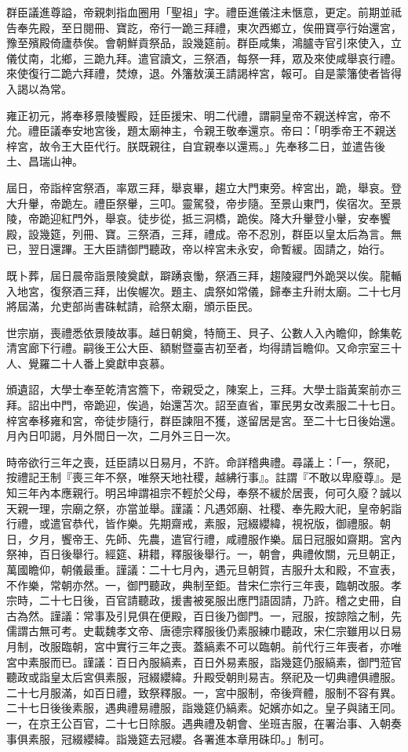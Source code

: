 \begin{pinyinscope}
群臣議進尊謚，帝親刺指血圈用「聖祖」字。禮臣進儀注未愜意，更定。前期並祗告奉先殿，至日閱冊、寶訖，帝行一跪三拜禮，東次西鄉立，俟冊寶亭行始還宮，豫至殯殿倚廬恭俟。會朝鮮貢祭品，設幾筵前。群臣咸集，鴻臚寺官引來使入，立儀仗南，北鄉，三跪九拜。遣官讀文，三祭酒，每祭一拜，眾及來使咸舉哀行禮。來使復行二跪六拜禮，焚燎，退。外籓敖漢王請謁梓宮，報可。自是蒙籓使者皆得入謁以為常。

雍正初元，將奉移景陵饗殿，廷臣援宋、明二代禮，謂嗣皇帝不親送梓宮，帝不允。禮臣議奉安地宮後，題太廟神主，令親王敬奉還京。帝曰：「明季帝王不親送梓宮，故令王大臣代行。朕既親往，自宜親奉以還焉。」先奉移二日，並遣告後土、昌瑞山神。

屆日，帝詣梓宮祭酒，率眾三拜，舉哀畢，趨立大門東旁。梓宮出，跪，舉哀。登大升轝，帝跪左。禮臣祭轝，三叩。靈駕發，帝步隨。至景山東門，俟宿次。至景陵，帝跪迎紅門外，舉哀。徒步從，抵三洞橋，跪俟。降大升轝登小轝，安奉饗殿，設幾筵，列冊、寶。三祭酒，三拜，禮成。帝不忍別，群臣以皇太后為言。無已，翌日還蹕。王大臣請御門聽政，帝以梓宮未永安，命暫緩。固請之，始行。

既卜葬，屆日晨帝詣景陵奠獻，躃踴哀慟，祭酒三拜，趨陵寢門外跪哭以俟。龍輴入地宮，復祭酒三拜，出俟幄次。題主、虞祭如常儀，歸奉主升祔太廟。二十七月將屆滿，允吏部尚書硃軾請，祫祭太廟，頒示臣民。

世宗崩，喪禮悉依景陵故事。越日朝奠，特簡王、貝子、公數人入內瞻仰，餘集乾清宮廊下行禮。嗣後王公大臣、額駙暨臺吉初至者，均得請旨瞻仰。又命宗室三十人、覺羅二十人番上奠獻申哀慕。

頒遺詔，大學士奉至乾清宮簷下，帝親受之，陳案上，三拜。大學士詣黃案前亦三拜。詔出中門，帝跪迎，俟過，始還苫次。詔至直省，軍民男女改素服二十七日。梓宮奉移雍和宮，帝徒步隨行，群臣諫阻不獲，遂留居是宮。至二十七日後始還。月內日叩謁，月外間日一次，二月外三日一次。

時帝欲行三年之喪，廷臣請以日易月，不許。命詳稽典禮。尋議上：「一，祭祀，按禮記王制『喪三年不祭，唯祭天地社稷，越紼行事』。註謂『不敢以卑廢尊』。是知三年內本應親行。明呂坤謂祖宗不輕於父母，奉祭不緩於居喪，何可久廢？誠以天親一理，宗廟之祭，亦當並舉。謹議：凡遇郊廟、社稷、奉先殿大祀，皇帝躬詣行禮，或遣官恭代，皆作樂。先期齋戒，素服，冠綴纓緯，視祝版，御禮服。朝日，夕月，饗帝王、先師、先農，遣官行禮，咸禮服作樂。屆日冠服如齋期。宮內祭神，百日後舉行。經筵、耕耤，釋服後舉行。一，朝會，典禮攸關，元旦朝正，萬國瞻仰，朝儀最重。謹議：二十七月內，遇元旦朝賀，吉服升太和殿，不宣表，不作樂，常朝亦然。一，御門聽政，典制至鉅。昔宋仁宗行三年喪，臨朝改服。孝宗時，二十七日後，百官請聽政，援書被冕服出應門語固請，乃許。稽之史冊，自古為然。謹議：常事及引見俱在便殿，百日後乃御門。一，冠服，按諒陰之制，先儒謂古無可考。史載魏孝文帝、唐德宗釋服後仍素服練巾聽政，宋仁宗雖用以日易月制，改服臨朝，宮中實行三年之喪。蓋縞素不可以臨朝。前代行三年喪者，亦唯宮中素服而已。謹議：百日內服縞素，百日外易素服，詣幾筵仍服縞素，御門蒞官聽政或詣皇太后宮俱素服，冠綴纓緯。升殿受朝則易吉。祭祀及一切典禮俱禮服。二十七月服滿，如百日禮，致祭釋服。一，宮中服制，帝後齊體，服制不容有異。二十七日後後素服，遇典禮易禮服，詣幾筵仍縞素。妃嬪亦如之。皇子與諸王同。一，在京王公百官，二十七日除服。遇典禮及朝會、坐班吉服，在署治事、入朝奏事俱素服，冠綴纓緯。詣幾筵去冠纓。各署進本章用硃印。」制可。


\end{pinyinscope}
